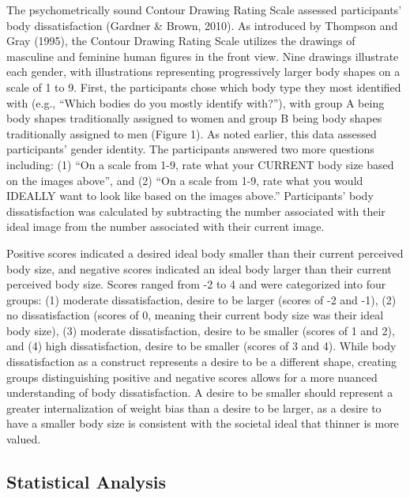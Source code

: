 \documentclass[
  jou,
  longtable,
  nolmodern,
  notxfonts,
  notimes,
  colorlinks=true,linkcolor=blue,citecolor=blue,urlcolor=blue]{apa7}
\begin{document}
The psychometrically sound Contour Drawing Rating Scale assessed
participants' body dissatisfaction (Gardner \& Brown, 2010). As
introduced by Thompson and Gray (1995), the Contour Drawing Rating Scale
utilizes the drawings of masculine and feminine human figures in the
front view. Nine drawings illustrate each gender, with illustrations
representing progressively larger body shapes on a scale of 1 to 9.
First, the participants chose which body type they most identified with
(e.g., ``Which bodies do you mostly identify with?''), with group A
being body shapes traditionally assigned to women and group B being body
shapes traditionally assigned to men (Figure 1). As noted earlier, this
data assessed participants' gender identity. The participants answered
two more questions including: (1) ``On a scale from 1-9, rate what your
CURRENT body size based on the images above'', and (2) ``On a scale from
1-9, rate what you would IDEALLY want to look like based on the images
above.'' Participants' body dissatisfaction was calculated by
subtracting the number associated with their ideal image from the number
associated with their current image.

Positive scores indicated a desired ideal body smaller than their
current perceived body size, and negative scores indicated an ideal body
larger than their current perceived body size. Scores ranged from -2 to
4 and were categorized into four groups: (1) moderate dissatisfaction,
desire to be larger (scores of -2 and -1), (2) no dissatisfaction
(scores of 0, meaning their current body size was their ideal body
size), (3) moderate dissatisfaction, desire to be smaller (scores of 1
and 2), and (4) high dissatisfaction, desire to be smaller (scores of 3
and 4). While body dissatisfaction as a construct represents a desire to
be a different shape, creating groups distinguishing positive and
negative scores allows for a more nuanced understanding of body
dissatisfaction. A desire to be smaller should represent a greater
internalization of weight bias than a desire to be larger, as a desire
to have a smaller body size is consistent with the societal ideal that
thinner is more valued.

\subsection{Statistical Analysis}\label{statistical-analysis}
\end{document}

